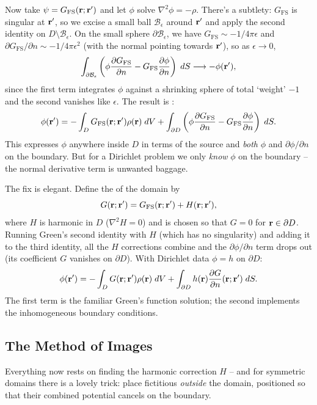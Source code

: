 \documentclass[a4paper]{scrartcl}
\begin{document}
Now take $\psi = G_{\text{FS}}(\mathbf{r}; \mathbf{r}')$ and let $\phi$ solve $\nabla^2 \phi = -\rho$. There's a subtlety: $G_{\text{FS}}$ is singular at $\mathbf{r}'$, so we excise a small ball $\mathcal{B}_\epsilon$ around $\mathbf{r}'$ and apply the second identity on $D \setminus \mathcal{B}_\epsilon$. On the small sphere $\partial \mathcal{B}_\epsilon$, we have $G_{\text{FS}} \sim -1/4\pi\epsilon$ and $\partial G_{\text{FS}}/\partial n \sim -1/4 \pi \epsilon^2$ (with the normal pointing towards $\mathbf{r}'$), so as $\epsilon \to 0$,
$$
\int_{\partial \mathcal{B}_\epsilon} \left(\phi \frac{\partial G_{\text{FS}}}{\partial n} - G_{\text{FS}} \frac{\partial \phi}{\partial n}\right) \; d S \longrightarrow -\phi(\mathbf{r}'),
$$
since the first term integrates $\phi$ against a shrinking sphere of total `weight' $-1$ and the second vanishes like $\epsilon$. The result is :
$$
\phi(\mathbf{r}') = -\int_D G_{\text{FS}}(\mathbf{r}; \mathbf{r}') \rho(\mathbf{r}) \; d V + \int_{\partial D} \left(\phi \frac{\partial G_{\text{FS}}}{\partial n} - G_{\text{FS}} \frac{\partial \phi}{\partial n}\right) \; d S.
$$
This expresses $\phi$ anywhere inside $D$ in terms of the source and \emph{both} $\phi$ and $\partial \phi/\partial n$ on the boundary. But for a Dirichlet problem we only \emph{know} $\phi$ on the boundary -- the normal derivative term is unwanted baggage.

The fix is elegant. Define the  of the domain by
$$
G(\mathbf{r}; \mathbf{r}') = G_{\text{FS}}(\mathbf{r}; \mathbf{r}') + H(\mathbf{r}; \mathbf{r}'),
$$
where $H$ is harmonic in $D$ ($\nabla^2 H = 0$) and is chosen so that $G = 0$ for $\mathbf{r} \in \partial D$. Running Green's second identity with $H$ (which has no singularity) and adding it to the third identity, all the $H$ corrections combine and the $\partial \phi/\partial n$ term drops out (its coefficient $G$ vanishes on $\partial D$). With Dirichlet data $\phi = h$ on $\partial D$:
$$
\phi(\mathbf{r}') = -\int_D G(\mathbf{r}; \mathbf{r}') \rho(\mathbf{r}) \; d V + \int_{\partial D} h(\mathbf{r}) \frac{\partial G}{\partial n}(\mathbf{r}; \mathbf{r}') \; d S.
$$
The first term is the familiar Green's function solution; the second implements the inhomogeneous boundary conditions.

\subsection{The Method of Images}

Everything now rests on finding the harmonic correction $H$ -- and for symmetric domains there is a lovely trick: place fictitious  \emph{outside} the domain, positioned so that their combined potential cancels on the boundary.
\end{document}
